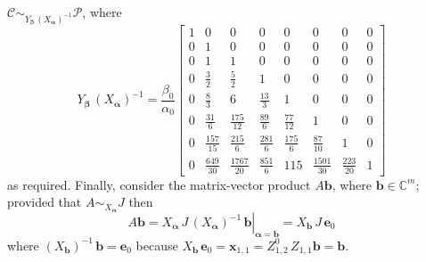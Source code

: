 $\mathcal{C} \sim_{Y_{\boldsymbol{\beta}}\,\left(X_{\boldsymbol{\alpha}}\right)^{-1}}\mathcal{P}$, where
\begin{displaymath}
{Y_{\boldsymbol{\beta}}\,\left(X_{\boldsymbol{\alpha}}\right)^{-1}} = \frac{\beta_{0}}{\alpha_{0}} \left[\begin{matrix}1 & 0 & 0 & 0 & 0 & 0 & 0 & 0\\0 & 1 & 0 & 0 & 0 & 0 & 0 & 0\\0 & 1 & 1 & 0 & 0 & 0 & 0 & 0\\0 & \frac{3}{2} & \frac{5}{2} & 1 & 0 & 0 & 0 & 0\\0 & \frac{8}{3} & 6 & \frac{13}{3} & 1 & 0 & 0 & 0\\0 & \frac{31}{6} & \frac{175}{12} & \frac{89}{6} & \frac{77}{12} & 1 & 0 & 0\\0 & \frac{157}{15} & \frac{215}{6} & \frac{281}{6} & \frac{175}{6} & \frac{87}{10} & 1 & 0\\0 & \frac{649}{30} & \frac{1767}{20} & \frac{851}{6} & 115 & \frac{1501}{30} & \frac{223}{20} & 1\end{matrix}\right]
\end{displaymath}
as required. Finally, consider the matrix-vector product $A\boldsymbol{b}$, where
$\boldsymbol{b}\in\mathbb{C}^{m}$; provided that $A\sim_{X_{\boldsymbol{\alpha}}}J$ then
\begin{displaymath}
A\boldsymbol{b} = \left.X_{\boldsymbol{\alpha}}\,J\,\left(X_{\boldsymbol{\alpha}}\right)^{-1}\,\boldsymbol{b}\right|_{\boldsymbol{\alpha}=\boldsymbol{b}}
                = X_{\boldsymbol{b}}\,J\,\boldsymbol{e}_{0}
\end{displaymath}
where $\left(X_{\boldsymbol{b}}\right)^{-1}\,\boldsymbol{b}=\boldsymbol{e}_{0}$ because 
$X_{\boldsymbol{b}}\,\boldsymbol{e}_{0}=\boldsymbol{x}_{1,1} = Z_{1,2}^{0}\,Z_{1,1}\boldsymbol{b}=\boldsymbol{b}$.





